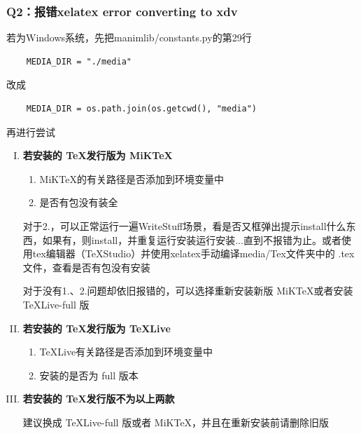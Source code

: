 \documentclass[a4paper]{article}
\begin{document}
\subsubsection*{Q2：报错xelatex error converting to xdv}
若为Windows系统，先把manimlib/constants.py的第29行
\begin{verbatim}
    MEDIA_DIR = "./media"
\end{verbatim}

改成
\begin{verbatim}
    MEDIA_DIR = os.path.join(os.getcwd(), "media")
\end{verbatim}

再进行尝试

\begin{enumerate}[I.]
    \item \textbf{若安装的 \TeX 发行版为 MiK\TeX}
    \begin{enumerate}[1.]
        \item MiK\TeX 的有关路径是否添加到环境变量中
        \item 是否有包没有装全
    \end{enumerate}

    \begin{tcolorbox}
        对于2.，可以正常运行一遍WriteStuff场景，看是否又框弹出提示install什么东西，如果有，则install，并重复运行安装运行安装...直到不报错为止。或者使用tex编辑器（\TeX Studio）并使用xelatex手动编译media/Tex文件夹中的 .tex 文件，查看是否有包没有安装
    \end{tcolorbox}
        
    \begin{tcolorbox}
        对于没有1.、2.问题却依旧报错的，可以选择重新安装新版 MiK\TeX 或者安装 \TeX Live-full 版
    \end{tcolorbox}

    \item \textbf{若安装的 \TeX 发行版为 \TeX Live}
    \begin{enumerate}[1.]
        \item \TeX Live有关路径是否添加到环境变量中
        \item 安装的是否为 full 版本
    \end{enumerate}

    \item \textbf{若安装的 \TeX 发行版不为以上两款}
    
    建议换成 \TeX Live-full 版或者 MiK\TeX，并且在重新安装前请删除旧版
\end{enumerate}
\end{document}
